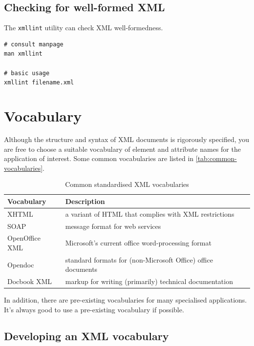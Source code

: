 \documentclass{pgnotes}
\begin{document}
\subsection{Checking for well-formed XML}

The \texttt{xmllint} utility can check XML well-formedness.

\begin{verbatim}
# consult manpage
man xmllint

# basic usage
xmllint filename.xml 
\end{verbatim}
 
  








\section{Vocabulary}

Although the structure and syntax of XML documents is rigorously specified, you are free to choose a suitable vocabulary of element and attribute names for the application of interest.
Some common vocabularies are listed in \autoref{tab:common-vocabularies}. 

\begin{table}[htbp]
  \centering
  \begin{tabularx}{1.0\linewidth}{l X}
    \toprule
    \textbf{Vocabulary} & \textbf{Description} \\
    \midrule
    XHTML & a variant of HTML that complies with XML restrictions \\
    SOAP & message format for web services \\
    OpenOffice XML & Microsoft's current office word-processing format \\
    Opendoc & standard formats for (non-Microsoft Office) office documents \\
    Docbook XML & markup for writing (primarily) technical documentation  \\
    \bottomrule
  \end{tabularx}
  \caption{Common standardised XML vocabularies}
  \label{tab:common-vocabularies}
\end{table}

In addition, there are pre-existing vocabularies for many specialised applications.
It's always good to use a pre-existing vocabulary if possible. 

\subsection{Developing an XML vocabulary}
\end{document}
